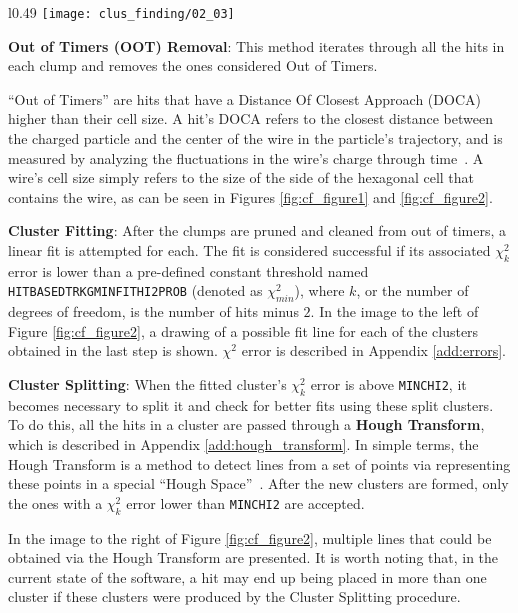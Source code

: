     \begin{wrapfigure}{l}{0.49\textwidth}
        \centering
        \texttt{[image: clus\_finding/02\_03]}
        \caption{\label{fig:cf_figure2} Cluster Fitting and Splitting algorithms over the layers in a superlayer.}
    \end{wrapfigure}

\textbf{Out of Timers (OOT) Removal}: This method iterates through all the hits in each clump and removes the ones considered Out of Timers.

``Out of Timers'' are hits that have a Distance Of Closest Approach (DOCA) higher than their cell size.
A hit's DOCA refers to the closest distance between the charged particle and the center of the wire in the particle's trajectory, and is measured by analyzing the fluctuations in the wire's charge through time~\cite{blum2008particle}.
A wire's cell size simply refers to the size of the side of the hexagonal cell that contains the wire, as can be seen in Figures \ref{fig:cf_figure1} and \ref{fig:cf_figure2}.

\textbf{Cluster Fitting}: After the clumps are pruned and cleaned from out of timers, a linear fit is attempted for each.
The fit is considered successful if its associated $\chi^2_k$ error is lower than a pre-defined constant threshold named \texttt{HITBASEDTRKGMINFITHI2PROB} (denoted as $\chi^2_{min}$), where $k$, or the number of degrees of freedom, is the number of hits minus $2$.
In the image to the left of Figure \ref{fig:cf_figure2}, a drawing of a possible fit line for each of the clusters obtained in the last step is shown.
$\chi^2$ error is described in Appendix \ref{add:errors}.

\textbf{Cluster Splitting}: When the fitted cluster's $\chi^2_k$ error is above \texttt{MINCHI2}, it becomes necessary to split it and check for better fits using these split clusters.
To do this, all the hits in a cluster are passed through a \textbf{Hough Transform}, which is described in Appendix \ref{add:hough_transform}.
In simple terms, the Hough Transform is a method to detect lines from a set of points via representing these points in a special ``Hough Space''~\cite{duda1971use}.
After the new clusters are formed, only the ones with a $\chi^2_k$ error lower than \texttt{MINCHI2} are accepted.

In the image to the right of Figure \ref{fig:cf_figure2}, multiple lines that could be obtained via the Hough Transform are presented.
It is worth noting that, in the current state of the software, a hit may end up being placed in more than one cluster if these clusters were produced by the Cluster Splitting procedure.